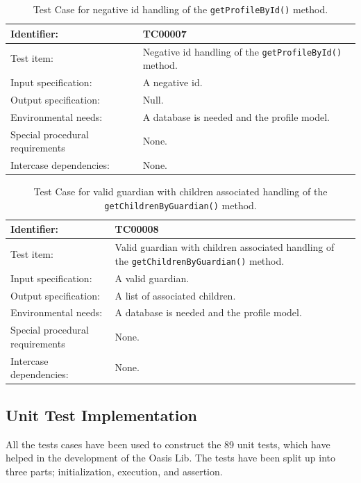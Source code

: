 \begin{table}[htbp]
	\centering
		\begin{tabular}{| p{4.5cm} | m{9cm} |}
			\hline
			Identifier: 					& TC00007 \\ \hline
			Test item:						& Negative id handling of the \texttt{getProfileById()} method. \\ \hline
			Input specification:			& A negative id. \\ \hline
			Output specification: 			& Null. \\ \hline
			Environmental needs:			& A database is needed and the profile model. \\ \hline
			Special procedural requirements	& None. \\ \hline
			Intercase dependencies:			& None. \\ \hline
		\end{tabular}
	\caption{Test Case for negative id handling of the \texttt{getProfileById()} method.}
	\label{tab:TestCase_NegativeIdHandling}
\end{table}

\begin{table}[htbp]
	\centering
		\begin{tabular}{| p{4.5cm} | m{9cm} |}
			\hline
			Identifier: 					& TC00008 \\ \hline
			Test item:						& Valid guardian with children associated handling of the \texttt{getChildrenByGuardian()} method. \\ \hline
			Input specification:			& A valid guardian. \\ \hline
			Output specification: 			& A list of associated children. \\ \hline
			Environmental needs:			& A database is needed and the profile model. \\ \hline
			Special procedural requirements	& None. \\ \hline
			Intercase dependencies:			& None. \\ \hline
		\end{tabular}
	\caption{Test Case for valid guardian with children associated handling of the \texttt{getChildrenByGuardian()} method.}
	\label{tab:TestCase_ValidGuardianWithChildrenAssociatedHandling}
\end{table}


\subsection{Unit Test Implementation}
All the tests cases have been used to construct the 89 unit tests, which have helped in the development of the Oasis Lib.
The tests have been split up into three parts; initialization, execution, and assertion.

